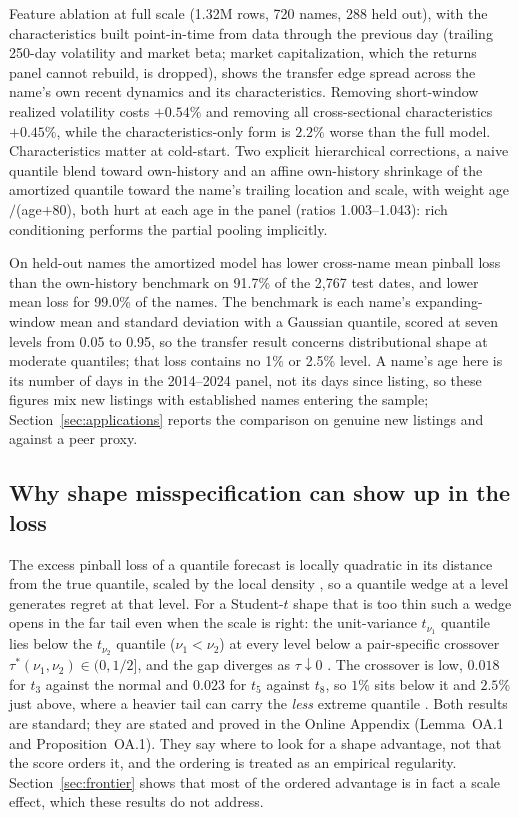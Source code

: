 \documentclass[11pt]{article}
\theoremstyle{remark}
\begin{document}
Feature ablation at full scale (1.32M rows, 720 names, 288 held out), with the characteristics built point-in-time from data through the previous day (trailing 250-day volatility and market beta; market capitalization, which the returns panel cannot rebuild, is dropped), shows the transfer edge spread across the name's own recent dynamics and its characteristics. Removing short-window realized volatility costs $+0.54\%$ and removing all cross-sectional characteristics $+0.45\%$, while the characteristics-only form is $2.2\%$ worse than the full model. Characteristics matter at cold-start. Two explicit hierarchical corrections, a naive quantile blend toward
own-history and an affine own-history shrinkage of the amortized quantile toward the name's trailing location and scale, with weight age$/$(age$+80$), both
hurt at each age in the panel (ratios 1.003--1.043): rich
conditioning performs the partial pooling implicitly.

On held-out names the amortized model has lower cross-name mean pinball loss than the own-history benchmark on 91.7\% of the 2{,}767 test dates, and lower mean loss for 99.0\% of the names. The benchmark is each name's expanding-window mean and standard deviation with a Gaussian quantile, scored at seven levels from 0.05 to 0.95, so the transfer result concerns distributional shape at moderate quantiles; that loss contains no 1\% or 2.5\% level. A name's age here is its number of days in the 2014--2024 panel, not its days since listing, so these figures mix new listings with established names entering the sample; Section~\ref{sec:applications} reports the comparison on genuine new listings and against a peer proxy.

\subsection{Why shape misspecification can show up in the loss}\label{sec:theory}

The excess pinball loss of a quantile forecast is locally quadratic in its distance from the true quantile, scaled by the local density \citep{gneiting2011, ehm2016, steinwart2011}, so a quantile wedge at a level generates regret at that level. For a Student-$t$ shape that is too thin such a wedge opens in the far tail even when the scale is right: the unit-variance $t_{\nu_1}$ quantile lies below the $t_{\nu_2}$ quantile ($\nu_1<\nu_2$) at every level below a pair-specific crossover $\tau^*(\nu_1,\nu_2)\in(0,1/2]$, and the gap diverges as $\tau\downarrow0$ \citep{mcneilfrey2000}. The crossover is low, $0.018$ for $t_3$ against the normal and $0.023$ for $t_5$ against $t_8$, so $1\%$ sits below it and $2.5\%$ just above, where a heavier tail can carry the \emph{less} extreme quantile \citep{patton2020}. Both results are standard; they are stated and proved in the Online Appendix (Lemma~OA.1 and Proposition~OA.1). They say where to look for a shape advantage, not that the score orders it, and the ordering is treated as an empirical regularity. Section~\ref{sec:frontier} shows that most of the ordered advantage is in fact a scale effect, which these results do not address.
\end{document}
